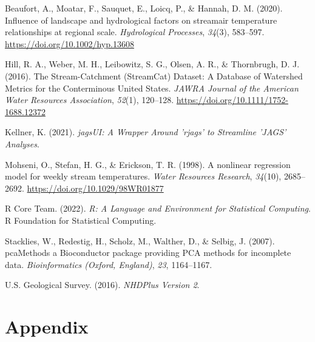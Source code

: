 \documentclass[
  11pt,
]{article}
\newlength{\cslhangindent}
\newlength{\cslentryspacingunit} %
\newenvironment{CSLReferences}[2] %
 {%
  \setlength{\parindent}{0pt}
  \ifodd #1
  \let\oldpar\par
  \def\par{\hangindent=\cslhangindent\oldpar}
  \fi
  \setlength{\parskip}{#2\cslentryspacingunit}
 }%
 {}
\begin{document}
\hypertarget{refs}{}
\begin{CSLReferences}{1}{0}
\leavevmode{}%
Beaufort, A., Moatar, F., Sauquet, E., Loicq, P., \& Hannah, D. M. (2020). Influence of landscape and hydrological factors on stream\textendash air temperature relationships at regional scale. \emph{Hydrological Processes}, \emph{34}(3), 583--597. \url{https://doi.org/10.1002/hyp.13608}

\leavevmode{}%
Hill, R. A., Weber, M. H., Leibowitz, S. G., Olsen, A. R., \& Thornbrugh, D. J. (2016). The {Stream-Catchment} ({StreamCat}) {Dataset}: {A Database} of {Watershed Metrics} for the {Conterminous United States}. \emph{JAWRA Journal of the American Water Resources Association}, \emph{52}(1), 120--128. \url{https://doi.org/10.1111/1752-1688.12372}

\leavevmode{}%
Kellner, K. (2021). \emph{{jagsUI}: {A Wrapper Around} 'rjags' to {Streamline} '{JAGS}' {Analyses}}.

\leavevmode{}%
Mohseni, O., Stefan, H. G., \& Erickson, T. R. (1998). A nonlinear regression model for weekly stream temperatures. \emph{Water Resources Research}, \emph{34}(10), 2685--2692. \url{https://doi.org/10.1029/98WR01877}

\leavevmode{}%
R Core Team. (2022). \emph{R: {A Language} and {Environment} for {Statistical Computing}}. R Foundation for Statistical Computing.

\leavevmode{}%
Stacklies, W., Redestig, H., Scholz, M., Walther, D., \& Selbig, J. (2007). {pcaMethods} \textendash{} a {Bioconductor} package providing {PCA} methods for incomplete data. \emph{Bioinformatics (Oxford, England)}, \emph{23}, 1164--1167.

\leavevmode{}%
U.S. Geological Survey. (2016). \emph{{NHDPlus Version} 2}.

\end{CSLReferences}

\newpage

\hypertarget{appendix}{%
\section{Appendix}\label{appendix}}
\end{document}
